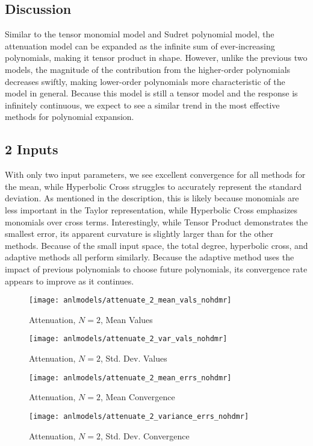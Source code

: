\subsection{Discussion}
Similar to the tensor monomial model and Sudret
polynomial model, the attenuation model can be expanded as the infinite sum of ever-increasing polynomials,
making it tensor product in shape.  However, unlike the previous two models, the magnitude of the contribution
from the higher-order polynomials decreases swiftly, making lower-order polynomials more characteristic of the
model in general.  Because this model is still a tensor model and the response is infinitely continuous,
we expect to see a similar trend in the most effective methods for polynomial expansion.

\subsection{2 Inputs}
With only two input parameters, we see excellent convergence for all methods for the mean, while Hyperbolic
Cross struggles to accurately represent the standard deviation.  As mentioned in the description, this is
likely because monomials are less important in the Taylor representation, while Hyperbolic Cross emphasizes
monomials over cross terms.  Interestingly, while Tensor
Product demonstrates the smallest error, its apparent curvature is slightly larger than for the other methods.
Because of the small input space, the total degree, hyperbolic cross, and adaptive methods all perform
similarly.  Because the adaptive method uses the impact of previous polynomials to choose future polynomials,
its convergence rate appears to improve as it continues.
\begin{figure}[H]
  \centering
  \texttt{[image: anlmodels/attenuate\_2\_mean\_vals\_nohdmr]}
  \caption{Attenuation, $N=2$, Mean Values}
  \label{fig:attenuate mean values 2}
\end{figure}
\begin{figure}[H]
  \centering
  \texttt{[image: anlmodels/attenuate\_2\_var\_vals\_nohdmr]}
  \caption{Attenuation, $N=2$, Std. Dev. Values}
  \label{fig:attenuate var values 2}
\end{figure}

\begin{figure}[H]
  \centering
  \texttt{[image: anlmodels/attenuate\_2\_mean\_errs\_nohdmr]}
  \caption{Attenuation, $N=2$, Mean Convergence}
  \label{fig:attenuate mean errors 2}
\end{figure}
\begin{figure}[H]
  \centering
  \texttt{[image: anlmodels/attenuate\_2\_variance\_errs\_nohdmr]}
  \caption{Attenuation, $N=2$, Std. Dev. Convergence}
  \label{fig:attenuate var errors 2}
\end{figure}


